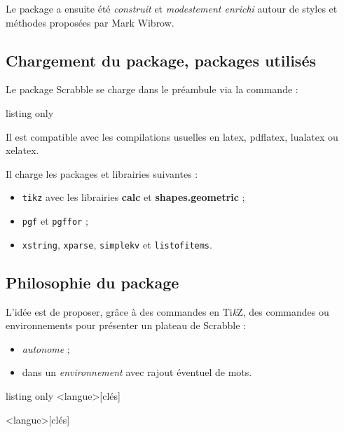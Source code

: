 \documentclass{article}
\providecommand\tikzlogo{Ti\textit{k}Z}
\let\TikZ\tikzlogo
\newcommand\Cle[1]{{\bfseries\sffamily\textlangle #1\textrangle}}
\begin{document}
\smallskip

Le package a ensuite été \textit{construit} et \textit{modestement enrichi} autour de styles et méthodes proposées par Mark Wibrow.

\subsection{Chargement du package, packages utilisés}

Le package \textsf{Scrabble} se charge dans le préambule via la commande :

\begin{PresentationCode}{listing only}
\usepackage{Scrabble}
\end{PresentationCode}

Il est compatible avec les compilations usuelles en \textsf{latex}, \textsf{pdflatex}, \textsf{lualatex} ou \textsf{xelatex}.

\medskip

Il charge les packages et librairies suivantes :

\begin{itemize}
	\item \texttt{tikz} avec les librairies \Cle{calc} et \Cle{shapes.geometric} ;
	\item \texttt{pgf} et \texttt{pgffor} ;
	\item \texttt{xstring}, \texttt{xparse}, \texttt{simplekv} et \texttt{listofitems}.
\end{itemize}

\subsection{\og Philosophie \fg{} du package}

L'idée est de proposer, grâce à des commandes en \TikZ, des \textsf{commandes} ou \textsf{environnements} pour présenter un plateau de Scrabble\texttrademark{} :

\begin{itemize}
	\item \textit{autonome} ;
	\item dans un \textit{environnement} avec rajout éventuel de mots.
\end{itemize}

\begin{PresentationCode}{listing only}
\PlateauScrabble<langue>[clés]

\begin{EnvScrabbleFR}<langue>[clés]
\end{EnvScrabbleFR}
\end{PresentationCode}
\end{document}
